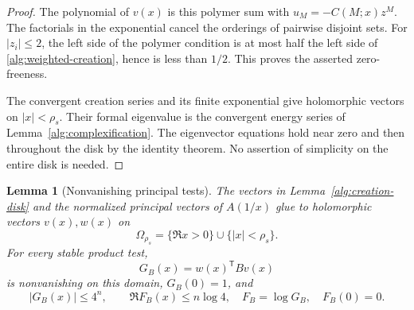 \documentclass[reqno]{amsart}
\newtheorem{lemma}[theorem]{Lemma}
\theoremstyle{definition}
\theoremstyle{remark}
\begin{document}
\begin{proof}
The polynomial of \(v(x)\) is this polymer sum with
\(u_M=-C(M;x)z^M\).  The factorials in the exponential cancel
the orderings of pairwise disjoint sets.  For \(|z_i|\le2\),
the left side of the polymer condition is at most half the
left side of \eqref{alg:weighted-creation}, hence is less than
\(1/2\).  This proves the asserted zero-freeness.

The convergent creation series and its finite exponential give
holomorphic vectors on \(|x|<\rho_s\).  Their formal eigenvalue
is the convergent energy series of
Lemma~\ref{alg:complexification}.  The eigenvector equations hold
near zero and then throughout the disk by the identity theorem.
No assertion of simplicity on the entire disk is needed.
\end{proof}

\begin{lemma}[Nonvanishing principal tests]\label{alg:test-domain}
The vectors in Lemma~\ref{alg:creation-disk} and the normalized
principal vectors of \(A(1/x)\) glue to holomorphic vectors
\(v(x),w(x)\) on
\[
 \Omega_{\rho_s}=\{\Re x>0\}\cup\{|x|<\rho_s\}.
\]
For every stable product test,
\begin{equation}\label{alg:test-function}
 G_B(x)=w(x)^{\mathsf T}Bv(x)
\end{equation}
is nonvanishing on this domain, \(G_B(0)=1\), and
\begin{equation}\label{alg:test-log-bound}
 |G_B(x)|\le4^n,\qquad
 \Re F_B(x)\le n\log4,\quad F_B=\log G_B,\quad F_B(0)=0 .
\end{equation}
\end{lemma}
\end{document}
